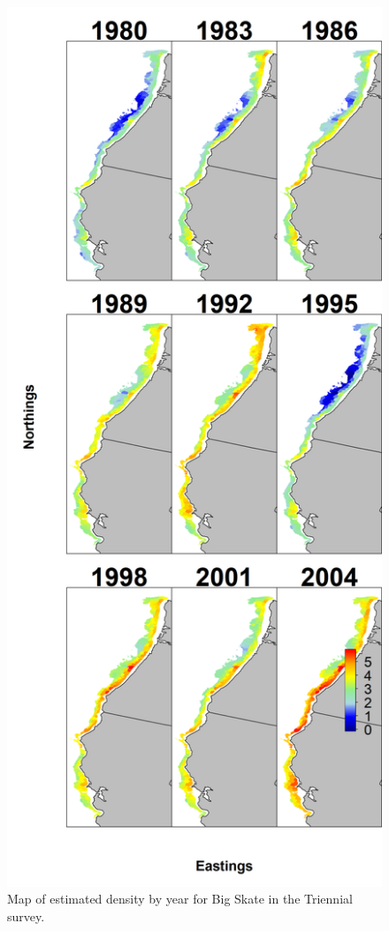 \documentclass[12pt,]{article}
\begin{document}
\begin{figure}
\centering
\includegraphics{Figures/VAST_Yearly_Dens_Triennial.png}
\caption{Map of estimated density by year for Big Skate in the Triennial
survey. \label{fig:VAST_Yearly_Dens_Triennial}}
\end{figure}
\end{document}
